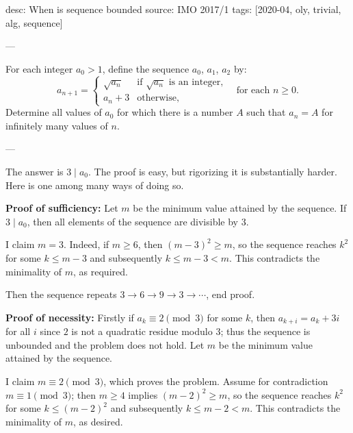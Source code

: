 desc: When is sequence bounded
source: IMO 2017/1
tags: [2020-04, oly, trivial, alg, sequence]

---

For each integer $a_0>1$, define the sequence $a_0$, $a_1$, $a_2$ by: \[a_{n+1}=\begin{cases}
        \sqrt{a_n}&\text{if $\sqrt{a_n}$ is an integer,}\\
        a_n+3&\text{otherwise,}
    \end{cases}\quad\text{for each $n\ge0$.}
\]
Determine all values of $a_0$ for which there is a number $A$ such that $a_n=A$ for infinitely many values of $n$.

---

The answer is $3\mid a_0$. The proof is easy, but rigorizing it is substantially harder. Here is one among many ways of doing so.

\bigskip

\textbf{Proof of sufficiency:} Let $m$ be the minimum value attained by the sequence. If $3\mid a_0$, then all elements of the sequence are divisible by $3$.

I claim $m=3$. Indeed, if $m\ge6$, then $(m-3)^2\ge m$, so the sequence reaches $k^2$ for some $k\le m-3$ and subsequently $k\le m-3<m$. This contradicts the minimality of $m$, as required.

Then the sequence repeats $3\to6\to9\to3\to\cdots$, end proof.

\bigskip

\textbf{Proof of necessity:} Firstly if $a_k\equiv2\pmod3$ for some $k$, then $a_{k+i}=a_k+3i$ for all $i$ since $2$ is not a quadratic residue modulo $3$; thus the sequence is unbounded and the problem does not hold. Let $m$ be the minimum value attained by the sequence.

I claim $m\equiv2\pmod3$, which proves the problem. Assume for contradiction $m\equiv1\pmod3$; then $m\ge4$ implies $(m-2)^2\ge m$, so the sequence reaches $k^2$ for some $k\le(m-2)^2$ and subsequently $k\le m-2<m$. This contradicts the minimality of $m$, as desired.
